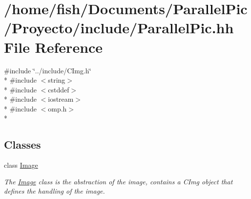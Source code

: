 \hypertarget{_parallel_pic_8hh}{\section{/home/fish/\-Documents/\-Parallel\-Pic/\-Proyecto/include/\-Parallel\-Pic.hh File Reference}
\label{_parallel_pic_8hh}
}
{\ttfamily \#include \char`\"{}../include/\-C\-Img.\-h\char`\"{}}\\*
{\ttfamily \#include $<$string$>$}\\*
{\ttfamily \#include $<$cstddef$>$}\\*
{\ttfamily \#include $<$iostream$>$}\\*
{\ttfamily \#include $<$omp.\-h$>$}\\*
\subsection*{Classes}
\begin{DoxyCompactItemize}
\item 
class \hyperlink{class_image}{Image}
\begin{DoxyCompactList}\small\item\em The \hyperlink{class_image}{Image} class is the abstraction of the image, contains a C\-Img object that defines the handling of the image. \end{DoxyCompactList}\end{DoxyCompactItemize}
